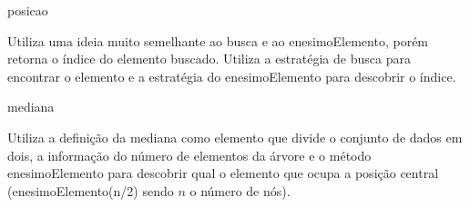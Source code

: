 \textsf{posicao}

Utiliza uma ideia muito semelhante ao busca e ao enesimoElemento, porém retorna 
o índice do elemento buscado. Utiliza a estratégia de busca para encontrar o 
elemento e a estratégia do enesimoElemento para descobrir o índice.

\textsf{mediana}

Utiliza a definição da mediana como elemento que divide o conjunto de dados em 
dois, a informação do número de elementos da árvore e o método 
\textsf{enesimoElemento} para descobrir qual o elemento que ocupa a posição 
central (\textsf{enesimoElemento(n/2)} sendo $n$ o número de nós). 

% 

